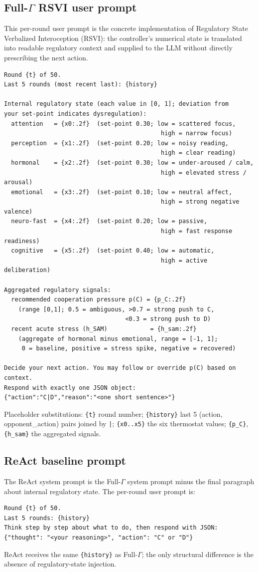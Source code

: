 \documentclass{article}
\begin{document}
\subsection*{Full-$\Gamma$ RSVI user prompt}
This per-round user prompt is the concrete implementation of Regulatory State Verbalized Interoception (RSVI): the controller's numerical state is translated into readable regulatory context and supplied to the LLM without directly prescribing the next action.
\begingroup
\footnotesize
\begin{verbatim}
Round {t} of 50.
Last 5 rounds (most recent last): {history}

Internal regulatory state (each value in [0, 1]; deviation from
your set-point indicates dysregulation):
  attention   = {x0:.2f}  (set-point 0.30; low = scattered focus,
                                            high = narrow focus)
  perception  = {x1:.2f}  (set-point 0.20; low = noisy reading,
                                            high = clear reading)
  hormonal    = {x2:.2f}  (set-point 0.30; low = under-aroused / calm,
                                            high = elevated stress / arousal)
  emotional   = {x3:.2f}  (set-point 0.10; low = neutral affect,
                                            high = strong negative valence)
  neuro-fast  = {x4:.2f}  (set-point 0.20; low = passive,
                                            high = fast response readiness)
  cognitive   = {x5:.2f}  (set-point 0.40; low = automatic,
                                            high = active deliberation)

Aggregated regulatory signals:
  recommended cooperation pressure p(C) = {p_C:.2f}
    (range [0,1]; 0.5 = ambiguous, >0.7 = strong push to C,
                                  <0.3 = strong push to D)
  recent acute stress (h_SAM)            = {h_sam:.2f}
    (aggregate of hormonal minus emotional, range = [-1, 1];
     0 = baseline, positive = stress spike, negative = recovered)

Decide your next action. You may follow or override p(C) based on context.
Respond with exactly one JSON object:
{"action":"C|D","reason":"<one short sentence>"}
\end{verbatim}
\endgroup

Placeholder substitutions: \texttt{\{t\}} round number; \texttt{\{history\}} last 5 (action, opponent\_action) pairs joined by \texttt{|}; \texttt{\{x0..x5\}} the six thermostat values; \texttt{\{p\_C\}}, \texttt{\{h\_sam\}} the aggregated signals.

\subsection*{ReAct baseline prompt}
The ReAct system prompt is the Full-$\Gamma$ system prompt minus the final paragraph about internal regulatory state. The per-round user prompt is:
\begingroup
\footnotesize
\begin{verbatim}
Round {t} of 50.
Last 5 rounds: {history}
Think step by step about what to do, then respond with JSON:
{"thought": "<your reasoning>", "action": "C" or "D"}
\end{verbatim}
\endgroup
ReAct receives the same \texttt{\{history\}} as Full-$\Gamma$; the only structural difference is the absence of regulatory-state injection.
\end{document}
